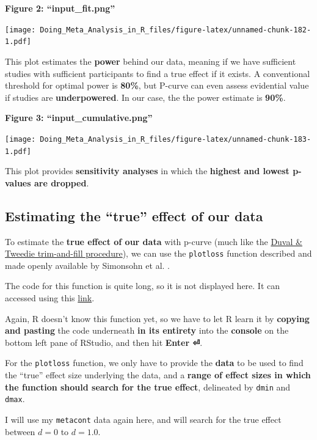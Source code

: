 \documentclass[]{book}
\begin{document}
\textbf{Figure 2: ``input\_fit.png''}

\texttt{[image: Doing\_Meta\_Analysis\_in\_R\_files/figure-latex/unnamed-chunk-182-1.pdf]}

This plot estimates the \textbf{power} behind our data, meaning if we have sufficient studies with sufficient participants to find a true effect if it exists. A conventional threshold for optimal power is \textbf{80\%}, but P-curve can even assess evidential value if studies are \textbf{underpowered}. In our case, the the power estimate is \textbf{90\%}.

\textbf{Figure 3: ``input\_cumulative.png''}

\texttt{[image: Doing\_Meta\_Analysis\_in\_R\_files/figure-latex/unnamed-chunk-183-1.pdf]}

This plot provides \textbf{sensitivity analyses} in which the \textbf{highest and lowest p-values are dropped}.

\hypertarget{estimating-the-true-effect-of-our-data}{%
\subsection{Estimating the ``true'' effect of our data}\label{estimating-the-true-effect-of-our-data}}

To estimate the \textbf{true effect of our data} with p-curve (much like the \protect\hyperlink{dant}{Duval \& Tweedie trim-and-fill procedure}), we can use the \texttt{plotloss} function described and made openly available by Simonsohn et al. \citep{simonsohn2014pb}.

The code for this function is quite long, so it is not displayed here. It can accessed using this \href{https://github.com/MathiasHarrer/Doing-Meta-Analysis-in-R/blob/master/true_effect_estimation.R}{link}.

Again, R doesn't know this function yet, so we have to let R learn it by \textbf{copying and pasting} the code underneath \textbf{in its entirety} into the \textbf{console} on the bottom left pane of RStudio, and then hit \textbf{Enter ⏎}.

For the \texttt{plotloss} function, we only have to provide the \textbf{data} to be used to find the ``true'' effect size underlying the data, and a \textbf{range of effect sizes in which the function should search for the true effect}, delineated by \texttt{dmin} and \texttt{dmax}.

I will use my \texttt{metacont} data again here, and will search for the true effect between \(d=0\) to \(d=1.0\).
\end{document}
